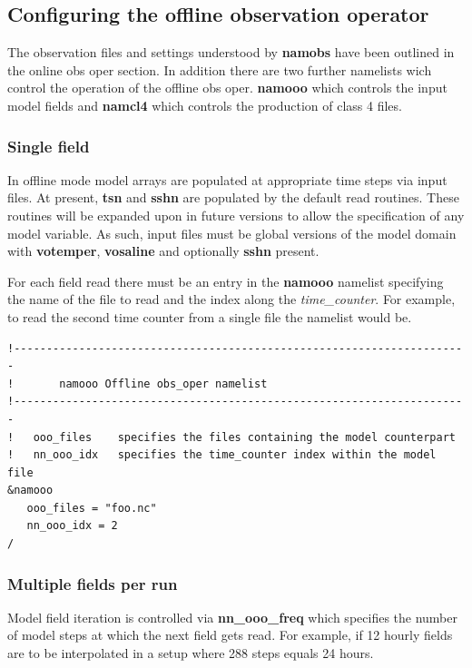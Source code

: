 \subsection{Configuring the offline observation operator}
The observation files and settings understood by \textbf{namobs} have been outlined in the online
obs oper section. In addition there are two further namelists wich control the operation of the offline
obs oper. \textbf{namooo} which controls the input model fields and \textbf{namcl4} which controls the
production of class 4 files. 

\subsubsection{Single field}

In offline mode model arrays are populated at appropriate time steps via input files.
At present, \textbf{tsn} and \textbf{sshn} are populated by the default read routines. 
These routines will be expanded upon in future versions to allow the specification of any
model variable. As such, input files must be global versions of the model domain with
\textbf{votemper}, \textbf{vosaline} and optionally \textbf{sshn} present.

For each field read there must be an entry in the \textbf{namooo} namelist specifying the
name of the file to read and the index along the \emph{time\_counter}. For example, to
read the second time counter from a single file the namelist would be.

\begin{alltt}
\tiny
\begin{verbatim} 
!----------------------------------------------------------------------
!       namooo Offline obs_oper namelist
!----------------------------------------------------------------------
!   ooo_files    specifies the files containing the model counterpart
!   nn_ooo_idx   specifies the time_counter index within the model file
&namooo
   ooo_files = "foo.nc"
   nn_ooo_idx = 2
/
\end{verbatim} 
\end{alltt}

\subsubsection{Multiple fields per run}

Model field iteration is controlled via \textbf{nn\_ooo\_freq} which specifies
the number of model steps at which the next field gets read. For example, if
12 hourly fields are to be interpolated in a setup where 288 steps equals 24 hours.

